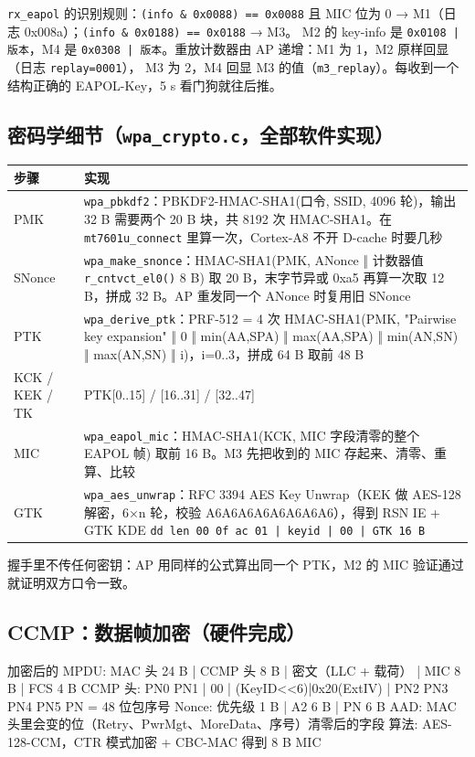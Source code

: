 \documentclass[UTF8,zihao=-4,fontset=none]{ctexart}
\newcommand{\fn}[1]{\texttt{#1}}
\begin{document}
\fn{rx\_eapol} 的识别规则：\fn{(info \& 0x0088) == 0x0088} 且 MIC 位为 0 → M1（日志 0x008a）；\fn{(info \& 0x0188) == 0x0188} → M3。
M2 的 key-info 是 \fn{0x0108 | 版本}，M4 是 \fn{0x0308 | 版本}。重放计数器由 AP 递增：M1 为 1，M2 原样回显（日志 \fn{replay=0001}），
M3 为 2，M4 回显 M3 的值（\fn{m3\_replay}）。每收到一个结构正确的 EAPOL-Key，5 s 看门狗就往后推。

\subsection{密码学细节（\fn{wpa\_crypto.c}，全部软件实现）}

\begin{longtable}{p{28mm}p{120mm}}
\toprule
步骤 & 实现 \\ \midrule \endhead
PMK & \fn{wpa\_pbkdf2}：PBKDF2-HMAC-SHA1(口令, SSID, 4096 轮)，输出 32 B 需要两个 20 B 块，共 8192 次 HMAC-SHA1。在 \fn{mt7601u\_connect} 里算一次，Cortex-A8 不开 D-cache 时要几秒 \\
SNonce & \fn{wpa\_make\_snonce}：HMAC-SHA1(PMK, ANonce ‖ 计数器值 \fn{r\_cntvct\_el0()} 8 B) 取 20 B，末字节异或 0xa5 再算一次取 12 B，拼成 32 B。AP 重发同一个 ANonce 时复用旧 SNonce \\
PTK & \fn{wpa\_derive\_ptk}：PRF-512 = 4 次 HMAC-SHA1(PMK, "Pairwise key expansion" ‖ 0 ‖ min(AA,SPA) ‖ max(AA,SPA) ‖ min(AN,SN) ‖ max(AN,SN) ‖ i)，i=0..3，拼成 64 B 取前 48 B \\
KCK / KEK / TK & PTK[0..15] / [16..31] / [32..47] \\
MIC & \fn{wpa\_eapol\_mic}：HMAC-SHA1(KCK, MIC 字段清零的整个 EAPOL 帧) 取前 16 B。M3 先把收到的 MIC 存起来、清零、重算、比较 \\
GTK & \fn{wpa\_aes\_unwrap}：RFC 3394 AES Key Unwrap（KEK 做 AES-128 解密，6×n 轮，校验 A6A6A6A6A6A6A6A6），得到 RSN IE + GTK KDE \fn{dd len 00 0f ac 01 | keyid | 00 | GTK 16 B} \\
\bottomrule
\end{longtable}

握手里不传任何密钥：AP 用同样的公式算出同一个 PTK，M2 的 MIC 验证通过就证明双方口令一致。

\subsection{CCMP：数据帧加密（硬件完成）}\label{sec:ccmp}

\begin{code}
加密后的 MPDU:  MAC 头 24 B | CCMP 头 8 B | 密文（LLC + 载荷） | MIC 8 B | FCS 4 B
CCMP 头:       PN0 PN1 | 00 | (KeyID<<6)|0x20(ExtIV) | PN2 PN3 PN4 PN5      PN = 48 位包序号
Nonce:         优先级 1 B | A2 6 B | PN 6 B
AAD:           MAC 头里会变的位（Retry、PwrMgt、MoreData、序号）清零后的字段
算法:          AES-128-CCM，CTR 模式加密 + CBC-MAC 得到 8 B MIC
\end{code}
\end{document}

